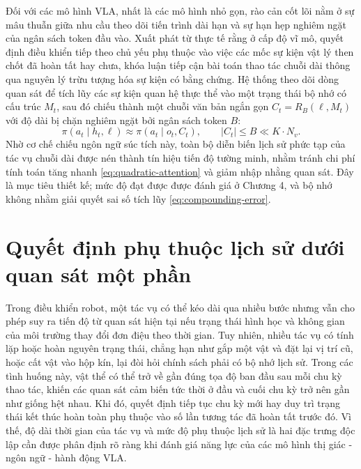 Đối với các mô hình VLA, nhất là các mô hình nhỏ gọn, rào cản cốt lõi nằm ở sự mâu thuẫn giữa nhu cầu theo dõi tiến trình dài hạn và sự hạn hẹp nghiêm ngặt của ngân sách token đầu vào. Xuất phát từ thực tế rằng ở cấp độ vĩ mô, quyết định điều khiển tiếp theo chủ yếu phụ thuộc vào việc các mốc sự kiện vật lý then chốt đã hoàn tất hay chưa, khóa luận tiếp cận bài toán thao tác chuỗi dài thông qua nguyên lý trừu tượng hóa sự kiện có bằng chứng. Hệ thống theo dõi dòng quan sát để tích lũy các sự kiện quan hệ thực thể vào một trạng thái bộ nhớ có cấu trúc $M_t$, sau đó chiếu thành một chuỗi văn bản ngắn gọn $C_t = R_B(\ell, M_t)$ với độ dài bị chặn nghiêm ngặt bởi ngân sách token $B$:
\begin{equation}
\pi(a_t \mid h_t, \ell) \approx \pi(a_t \mid o_t, C_t), \qquad |C_t| \le B \ll K \cdot N_v.
\label{eq:event-projection-policy}
\end{equation}
Nhờ cơ chế chiếu ngôn ngữ súc tích này, toàn bộ diễn biến lịch sử phức tạp của tác vụ chuỗi dài được nén thành tín hiệu tiến độ tường minh, nhằm tránh chi phí tính toán tăng nhanh \eqref{eq:quadratic-attention} và giảm nhập nhằng quan sát. Đây là mục tiêu thiết kế; mức độ đạt được được đánh giá ở Chương 4, và bộ nhớ không nhằm giải quyết sai số tích lũy \eqref{eq:compounding-error}.

\section{Quyết định phụ thuộc lịch sử dưới quan sát một phần}
\label{sec:pomdp}

Trong điều khiển robot, một tác vụ có thể kéo dài qua nhiều bước nhưng vẫn cho phép suy ra tiến độ từ quan sát hiện tại nếu trạng thái hình học và không gian của môi trường thay đổi đơn điệu theo thời gian. Tuy nhiên, nhiều tác vụ có tính lặp hoặc hoàn nguyên trạng thái, chẳng hạn như gắp một vật và đặt lại vị trí cũ, hoặc cất vật vào hộp kín, lại đòi hỏi chính sách phải có bộ nhớ lịch sử. Trong các tình huống này, vật thể có thể trở về gần đúng tọa độ ban đầu sau mỗi chu kỳ thao tác, khiến các quan sát cảm biến tức thời ở đầu và cuối chu kỳ trở nên gần như giống hệt nhau. Khi đó, quyết định tiếp tục chu kỳ mới hay duy trì trạng thái kết thúc hoàn toàn phụ thuộc vào số lần tương tác đã hoàn tất trước đó. Vì thế, độ dài thời gian của tác vụ và mức độ phụ thuộc lịch sử là hai đặc trưng độc lập cần được phân định rõ ràng khi đánh giá năng lực của các mô hình thị giác - ngôn ngữ - hành động VLA.

